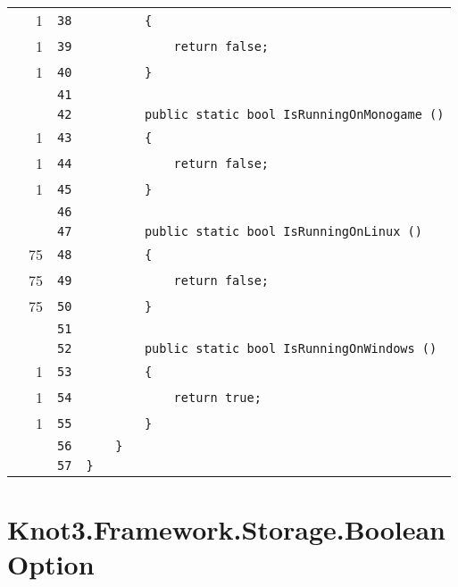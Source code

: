 \documentclass[a4paper,10pt]{article}
\begin{document}
\begin{longtable}[l]{lrrl}
\cellcolor{green} & 1 & \verb~38~ & \verb~        {~\\
\cellcolor{green} & 1 & \verb~39~ & \verb~            return false;~\\
\cellcolor{green} & 1 & \verb~40~ & \verb~        }~\\
\cellcolor{gray} &  & \verb~41~ & \verb~~\\
\cellcolor{gray} &  & \verb~42~ & \verb~        public static bool IsRunningOnMonogame ()~\\
\cellcolor{green} & 1 & \verb~43~ & \verb~        {~\\
\cellcolor{green} & 1 & \verb~44~ & \verb~            return false;~\\
\cellcolor{green} & 1 & \verb~45~ & \verb~        }~\\
\cellcolor{gray} &  & \verb~46~ & \verb~~\\
\cellcolor{gray} &  & \verb~47~ & \verb~        public static bool IsRunningOnLinux ()~\\
\cellcolor{green} & 75 & \verb~48~ & \verb~        {~\\
\cellcolor{green} & 75 & \verb~49~ & \verb~            return false;~\\
\cellcolor{green} & 75 & \verb~50~ & \verb~        }~\\
\cellcolor{gray} &  & \verb~51~ & \verb~~\\
\cellcolor{gray} &  & \verb~52~ & \verb~        public static bool IsRunningOnWindows ()~\\
\cellcolor{green} & 1 & \verb~53~ & \verb~        {~\\
\cellcolor{green} & 1 & \verb~54~ & \verb~            return true;~\\
\cellcolor{green} & 1 & \verb~55~ & \verb~        }~\\
\cellcolor{gray} &  & \verb~56~ & \verb~    }~\\
\cellcolor{gray} &  & \verb~57~ & \verb~}~\\
\end{longtable}
\newpage
\section{Knot3.Framework.Storage.BooleanOption}
\end{document}
